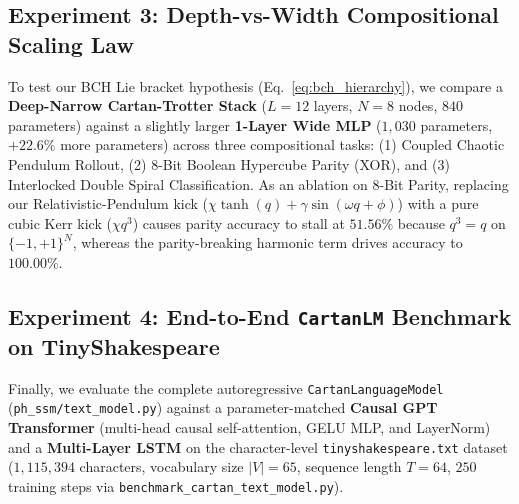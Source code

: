 \documentclass[11pt,a4paper]{article}
\begin{document}
\subsection{Experiment 3: Depth-vs-Width Compositional Scaling Law}
To test our BCH Lie bracket hypothesis (Eq.~\eqref{eq:bch_hierarchy}), we compare a \textbf{Deep-Narrow Cartan-Trotter Stack} ($L=12$ layers, $N=8$ nodes, $840$ parameters) against a slightly larger \textbf{1-Layer Wide MLP} ($1,030$ parameters, $+22.6\%$ more parameters) across three compositional tasks: (1) Coupled Chaotic Pendulum Rollout, (2) 8-Bit Boolean Hypercube Parity (XOR), and (3) Interlocked Double Spiral Classification. As an ablation on 8-Bit Parity, replacing our Relativistic-Pendulum kick ($\chi\tanh(q) + \gamma\sin(\omega q + \phi)$) with a pure cubic Kerr kick ($\chi q^3$) causes parity accuracy to stall at $51.56\%$ because $q^3 = q$ on $\{-1,+1\}^N$, whereas the parity-breaking harmonic term drives accuracy to $100.00\%$.

\begin{table}[htbp]
\centering
\caption{Comparison of Deep Cartan-Trotter ($L=12$) vs.\ Wide 1-Layer MLP (reported from an earlier standalone run; training script not included in this repository).}
\label{tab:depth_vs_width}
\vspace{0.3em}
\end{table}

\subsection{Experiment 4: End-to-End \texttt{CartanLM} Benchmark on TinyShakespeare}
Finally, we evaluate the complete autoregressive \texttt{CartanLanguageModel} (\texttt{ph\_ssm/text\_model.py}) against a parameter-matched \textbf{Causal GPT Transformer} (multi-head causal self-attention, GELU MLP, and LayerNorm) and a \textbf{Multi-Layer LSTM} on the character-level \texttt{tinyshakespeare.txt} dataset ($1,115,394$ characters, vocabulary size $|V|=65$, sequence length $T=64$, $250$ training steps via \texttt{benchmark\_cartan\_text\_model.py}).
\end{document}
